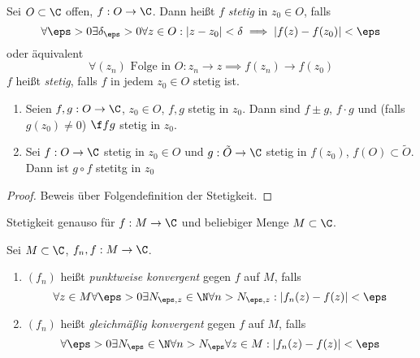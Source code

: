 \documentclass[a4paper,10pt]{scrartcl}
\begin{document}
\begin{df}
	\label{df:1.9}
	Sei $O\subset \C$ offen, $f: O \to \C$.
	Dann heißt $f$ \emph{stetig} in $z_0\in O$, falls
	\[
		\forall \eps> 0 \exists \delta_\eps > 0 \forall z\in O : |z-z_0| < \delta \implies |f(z) -f(z_0)| < \eps
	\]
	oder äquivalent
	\[
		\forall (z_n) \text{ Folge in } O: z_n \to z \implies f(z_n) \to f(z_0)
	\]
	$f$ heißt \emph{stetig}, falls $f$ in jedem $z_0\in O$ stetig ist.
\end{df}

\begin{st}
	\label{st:1.10}
	\begin{enumerate}
		\item 
			Seien $f,g: O\to \C$, $z_0\in O$, $f,g$ stetig in $z_0$.
			Dann sind $f\pm g$, $f\cdot g$ und (falls $g(z_0)\neq 0$) $\f fg$ stetig in $z_0$.
		\item
			Sei $f:O\to \C$ stetig in $z_0\in O$ und $g:\tilde O \to \C$ stetig in $f(z_0)$, $f(O) \subset \tilde O$.
			Dann ist $g\circ f$ stetitg in $z_0$
	\end{enumerate}
\end{st}
\begin{proof}
Beweis über Folgendefinition der Stetigkeit.
\end{proof}

\begin{nt}
	\label{nt:1.10}
	Stetigkeit genauso für $f:M\to \C$ und beliebiger Menge $M\subset \C$.
\end{nt}

\begin{df}[Funktionenfolgen]
	Sei $M\subset \C$, $f_n,f: M \to \C$.
	\begin{enumerate}[1)]
		\item 
			$(f_n)$ heißt \emph{punktweise konvergent} gegen $f$ auf $M$, falls
			\[
				\forall z\in M \forall \eps > 0 \exists N_{\eps,z} \in \N \forall n>N_{\eps,z}: |f_n(z) - f(z)| < \eps
			\]
		\item
			$(f_n)$ heißt \emph{gleichmäßig konvergent} gegen $f$ auf $M$, falls
			\[
				\forall \eps>0 \exists N_{\eps} \in \N \forall n>N_{\eps} \forall z\in M : |f_n(z)-f(z)| < \eps
			\]
	\end{enumerate}
\end{df}
\end{document}
